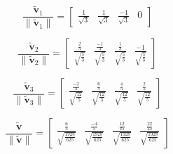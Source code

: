 \documentclass{tufte-book}
\newcommand{\vct}{\mathbf}
\theoremstyle{mytheoremstyle}
\theoremstyle{mylemstyle}
\theoremstyle{mydefstyle}
\begin{document}
\begin{enumerate}
\[ \frac{\vct{\tilde{v}}_1}{\|\vct{\tilde{v}}_1\|} =
\begin{bmatrix}
\frac{1}{\sqrt{3}} & \frac{1}{\sqrt{3}} & \frac{-1}{\sqrt{3}} & 0
\end{bmatrix} \]

\[ \frac{\vct{\tilde{v}}_2}{\|\vct{\tilde{v}}_2\|} =
\begin{bmatrix}
\frac{\frac{2}{3}}{\sqrt{\frac{5}{3}}} &\frac{\frac{-1}{3}}{\sqrt{\frac{5}{3}}} & \frac{\frac{1}{3}}{\sqrt{\frac{5}{3}}}& \frac{-1}{\sqrt{\frac{5}{3}}}
\end{bmatrix} \]

\[ \frac{\vct{\tilde{v}}_3}{\|\vct{\tilde{v}}_3\|} =
\begin{bmatrix}
\frac{\frac{-2}{3}}{\sqrt{\frac{12}{5}}} &\frac{\frac{6}{5}}{\sqrt{\frac{12}{5}}} & \frac{\frac{4}{5}}{\sqrt{\frac{12}{5}}}& \frac{\frac{2}{5}}{\sqrt{\frac{12}{5}}}
\end{bmatrix} \]

\[ \frac{\vct{\tilde{v}}}{\|\vct{\tilde{v}}\|} =
\begin{bmatrix}
\frac{\frac{6}{5}}{\sqrt{\frac{1928}{625}}} &\frac{\frac{-4}{5}}{\sqrt{\frac{1928}{625}}} & \frac{\frac{12}{25}}{\sqrt{\frac{1928}{625}}}& \frac{\frac{22}{25}}{\sqrt{\frac{1928}{625}}}
\end{bmatrix} \]
\end{enumerate}
\end{document}
